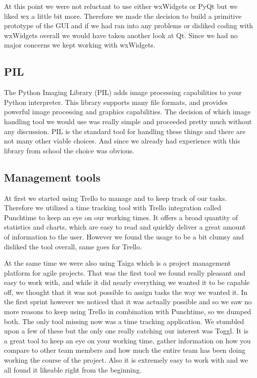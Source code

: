 At this point we were not reluctant to use either wxWidgets or PyQt but we liked wx a little bit more. Therefore we made the decision to build a primitive prototype of the GUI and if we had ran into any problems or disliked coding with wxWidgets overall we would have taken another look at Qt. Since we had no major concerns we kept working with wxWidgets.

\subsection{PIL}
The Python Imaging Library (PIL) adds image processing capabilities to your Python interpreter. This library supports many file formats, and provides powerful image processing and graphics capabilities. The decision of which image handling tool we would use was really simple and proceeded pretty much without any discussion. PIL is the standard tool for handling these things and there are not many other viable choices. And since we already had experience with this library from school the choice was obvious.

\subsection{Management tools}
At first we started using Trello to manage and to keep track of our tasks. Therefore we  utilized a time tracking tool with Trello integration called Punchtime to keep an eye on our working times. It offers a broad quantity of statistics and charts, which are easy to read and quickly deliver a great amount of information to the user. However we found the usage to be a bit clumsy and disliked the tool overall, same goes for Trello.

At the same time we were also using Taiga which is a project management platform for agile projects. That was the first tool we found really pleasant and easy to work with, and while it did nearly everything we wanted it to be capable off, we thought that it was not possible to assign tasks the way we wanted it. In the first sprint however we noticed that it was actually possible and so we saw no more reasons to keep using Trello in combination with Punchtime, so we dumped both. The only tool missing now was a time tracking application. We stumbled upon a few of these but the only one really catching our interest was Toggl. It is a great tool to keep an eye on your working time, gather information on how you compare to other team members and how much the entire team has been doing working the course of the project. Also it is extremely easy to work with and we all found it likeable right from the beginning.

